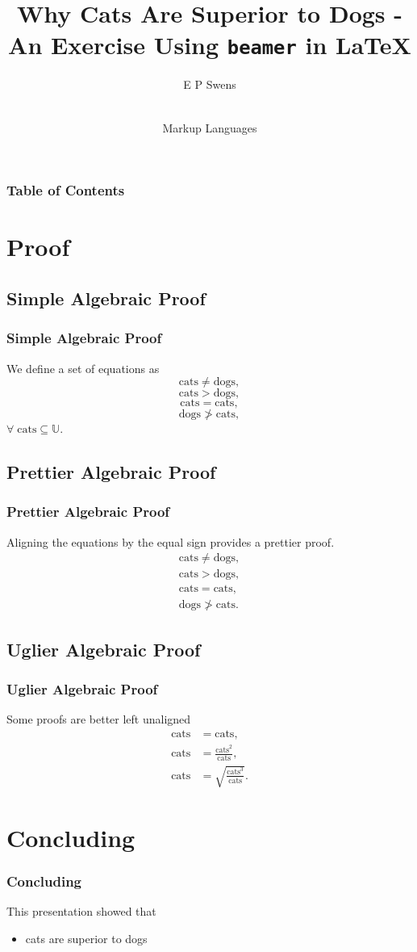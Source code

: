\documentclass{beamer}
\title[Example] {Why Cats Are Superior to Dogs - An Exercise Using \texttt{beamer} in \LaTeX}
\author[Your Name]{E P Swens}
\date[MLRPS]
{\vspace{.5 in}\\ Markup Languages}
\begin{document}
\titlepage

\begin{frame}
\frametitle{Table of Contents}
\tableofcontents
\end{frame}

\section{Proof}

\subsection{Simple Algebraic Proof}
\begin{frame}
\frametitle{Simple Algebraic Proof}
    We define a set of equations as
    \begin{equation}
        \text{cats} \ne \text{dogs},
    \end{equation}
    \begin{equation}
    	\text{cats} > \text{dogs},
    \end{equation}
    \begin{equation}
    \text{cats} = \text{cats},
    \end{equation}
    \begin{equation}
    	\text{dogs} \ngtr \text{cats},
    \end{equation}
    $\forall \; \text{cats} \subseteq \mathbb U$. 
\end{frame}

\subsection{Prettier Algebraic Proof}
\begin{frame}
\frametitle{Prettier Algebraic Proof}
    Aligning the equations by the equal sign provides a prettier proof. 
    \begin{align}
    	\text{cats} \ne \text{dogs},\\
    	\text{cats} > \text{dogs}, \\
    	\text{cats} = \text{cats},\\
    	\text{dogs} \ngtr \text{cats}.
    \end{align}
\end{frame}

\subsection{Uglier Algebraic Proof}
\begin{frame}
\frametitle{Uglier Algebraic Proof}
Some proofs are better left unaligned
\begin{align}
\text{cats} &= \text{cats},\\
\text{cats} &=\frac{\text{cats}^2}{\text{cats}},\\
\text{cats} &=\sqrt{\frac{\text{cats}^3}{\text{cats}}}.
\end{align}
\end{frame}

\section{Concluding}
\begin{frame}
\frametitle{Concluding}
This presentation showed that
\begin{itemize}
\item cats are superior to dogs
\end{itemize}
\end{frame}
\end{document}
